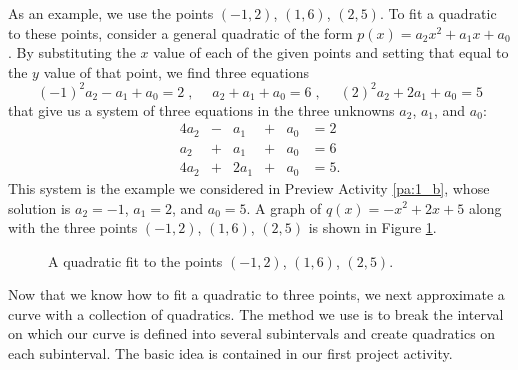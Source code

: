 As an example, we use the points $(-1, 2)$, $(1,6)$, $(2,5)$. To fit a quadratic to these points, consider a general quadratic of the form $p(x)=a_2x^2+a_1x+a_0$. By substituting the $x$ value of each of the given points and setting that equal to the $y$ value of that point, we find three equations
\[ (-1)^2a_2-a_1+a_0=2 \; , \; \quad a_2+a_1+a_0=6 \; , \; \quad (2)^2a_2 +2a_1+a_0=5 \]
that give us a system of three equations in the three unknowns $a_2$, $a_1$, and $a_0$:
\begin{alignat*}{4}
{}a_2	&{}-{} 	&{}a_1 	&{}+{}	&{}a_0 	&= 2   \\
{}a_2 	&{}+{}	&{}a_1 	&{}+{}	&{}a_0  &= 6   \\
{4}a_2	&{}+{} 	&{2}a_1	&{}+{} 	&{}a_0 	&= 5. 
\end{alignat*} 
This system is the example we considered in Preview Activity \ref{pa:1_b}, whose solution is $a_2 = -1$, $a_1=2$, and $a_0 = 5$. A graph of $q(x) = -x^2+2x+5$ along with the three points $(-1, 2)$, $(1,6)$, $(2,5)$ is shown in Figure \ref{F:1_b_quadratic_fit}. 
\begin{figure}[h]
\begin{center}
\end{center}
\caption{A quadratic fit to the points $(-1, 2)$, $(1,6)$, $(2,5)$.}
\label{F:1_b_quadratic_fit}
\end{figure}

Now that we know how to fit a quadratic to three points, we next approximate a curve with a collection of quadratics. The method we use is to break the interval on which our curve is defined into several subintervals and create quadratics on each subinterval. The basic idea is contained in our first project activity.
 

